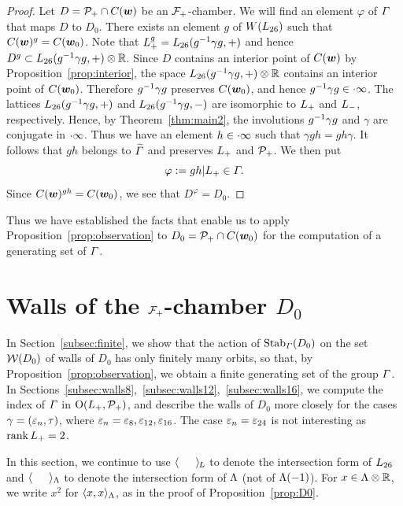 \documentclass{amsart} %
\begin{document}
%
\begin{proof}
Let $D=\mathord{\mathcal{P}}_{+} \cap \mathord{C}(\boldsymbol{w})$ be an $\mathord{\mathcal{F}}_{+}$-chamber.
We will find an element $\varphi$ of $\varGamma$ 
that maps $D$ to $D_0$.
There exists an element $g$ of $W(L_{26})$
such that $\mathord{C}(\boldsymbol{w})^g=\mathord{C}(\boldsymbol{w}_0)$.
Note that $L_{+}^g=L_{26}(g^{-1} \gamma g, +)$
and hence $D^g\subset L_{26}(g^{-1} \gamma g, +)\otimes \mathord{\mathbb{R}}$.
Since $D$ contains an interior point of $\mathord{C}(\boldsymbol{w})$ by 
Proposition~\ref{prop:interior},
the space $L_{26}(g^{-1} \gamma g, +)\otimes \mathord{\mathbb{R}}$ contains an interior point of $\mathord{C}(\boldsymbol{w}_0)$.
Therefore $g^{-1} \gamma g$ preserves $\mathord{C}(\boldsymbol{w}_0)$,
and hence $g^{-1} \gamma g \in \cdot \infty$.
The lattices $L_{26}(g^{-1} \gamma g, + )$ and $L_{26}(g^{-1} \gamma g, -)$
are isomorphic to $L_{+}$ and $L_{-}$, respectively.
Hence, by Theorem~\ref{thm:main2},
the involutions $g^{-1} \gamma g$ and $\gamma$ are conjugate in $\cdot \infty$.
Thus we have an element $h\in \cdot \infty$
such that $\gamma g h =gh\gamma $.
It follows that $gh$ belongs to $\widetilde{\varGamma}$ and preserves $L_{+}$ and $\mathord{\mathcal{P}}_{+}$.
We then put
\[
\varphi:=gh|L_{+}\in \varGamma.
\]
Since $\mathord{C}(\boldsymbol{w})^{gh}=\mathord{C}(\boldsymbol{w}_0)$,
we see that $D^\varphi=D_0$.
\end{proof}
%
Thus we have established the facts that enable us 
to apply Proposition~\ref{prop:observation}
to $D_0=\mathord{\mathcal{P}}_{+}\cap \mathord{C}(\boldsymbol{w}_0)$ 
for the computation of a generating set of
$\varGamma$.
%
%
\section{Walls of the $\mathord{\mathcal{F}}_{+}$-chamber $D_0$}\label{sec:wallsD0}
%
In Section~\ref{subsec:finite},
we show that 
the action of $\operatorname{Stab}_{\varGamma}(D_0)$ on the set $\mathord{\mathcal{W}}(D_0)$ of 
walls of $D_0$ has only finitely many orbits,
so that, by Proposition~\ref{prop:observation},
we obtain a finite generating set of the group $\varGamma$.
In Sections~\ref{subsec:walls8},~\ref{subsec:walls12},~\ref{subsec:walls16}, 
we compute the index of $\varGamma$ in
$\mathord{\mathrm{O}}(L_{+}, \mathord{\mathcal{P}}_{+})$,
and describe the walls of $D_0$ more closely
for the cases $\gamma=(\varepsilon_n, \tau)$,
where $\varepsilon_n=\varepsilon_8, \varepsilon_{12}, \varepsilon_{16}$.
The case $\varepsilon_n=\varepsilon_{24}$ is not interesting as $\operatorname{rank} L_{+}=2$.
%
\par
In this section,
we continue to use
$\langle \phantom{a, a} \rangle_{\hskip -1pt L}$ to denote the intersection form of $L_{26}$
and $\langle \phantom{a, a} \rangle_{\Lambda}$ to denote the intersection form of $\Lambda$
(not of $\Lambda(-1)$).
For $x\in \Lambda\otimes\mathord{\mathbb{R}}$, we write $x^2$ for $\langle x,x \rangle_{\Lambda}$,
as in the proof of Proposition~\ref{prop:D0}.
%
\end{document}
